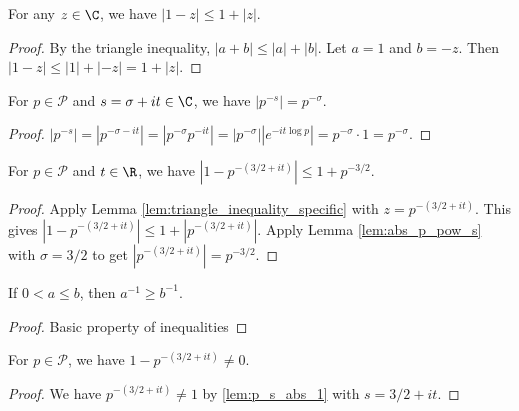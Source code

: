 \begin{lemma}\label{lem:triangle_inequality_specific} 
\leanok
For any $z\in\C$, we have $|1-z| \le 1+|z|$.
\end{lemma}
\begin{proof}
\leanok
By the triangle inequality, $|a+b| \le |a|+|b|$. Let $a=1$ and $b=-z$. Then $|1-z| \le |1|+|-z| = 1+|z|$.
\end{proof}

\begin{lemma}\label{lem:abs_p_pow_s} 
\leanok
{}
For $p\in\mathcal{P}$ and $s=\sigma+it \in\C$, we have $|p^{-s}| = p^{-\sigma}$.
\end{lemma}
\begin{proof}
\leanok
$|p^{-s}| = |p^{-\sigma-it}| = |p^{-\sigma}p^{-it}| = |p^{-\sigma}||e^{-it\log p}| = p^{-\sigma} \cdot 1 = p^{-\sigma}$.
\end{proof}

\begin{lemma}\label{lem:abs_term_bound} 
\leanok
{}
For $p\in\mathcal{P}$ and $t\in\R$, we have $|1 - p^{-(3/2+it)}| \le 1 + p^{-3/2}$.
\end{lemma}
\begin{proof} \leanok
{}
Apply Lemma \ref{lem:triangle_inequality_specific} with $z=p^{-(3/2+it)}$. This gives $|1 - p^{-(3/2+it)}| \le 1 + |p^{-(3/2+it)}|$. Apply Lemma \ref{lem:abs_p_pow_s} with $\sigma=3/2$ to get $|p^{-(3/2+it)}| = p^{-3/2}$.
\end{proof}

\begin{lemma}\label{lem:inv_inequality} 
\leanok
If $0 < a \le b$, then $a^{-1} \ge b^{-1}$.
\end{lemma}
\begin{proof}
\leanok
Basic property of inequalities
\end{proof}

\begin{lemma}\label{lem:condp32} 
\leanok
{}
For $p\in\mathcal{P}$, we have $1 - p^{-(3/2+it)}\neq 0$.
\end{lemma}
\begin{proof}
\leanok
{}
We have $p^{-(3/2+it)}\neq1$ by \cref{lem:p_s_abs_1} with $s=3/2+it$.
\end{proof}

